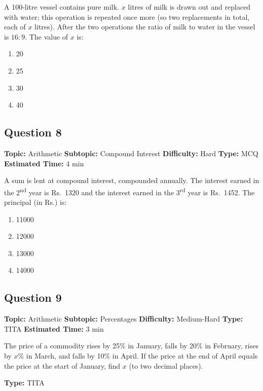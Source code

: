 \documentclass[11pt]{article}
\begin{document}
\begin{tcolorbox}
A 100-litre vessel contains pure milk. $x$ litres of milk is drawn out and replaced with water; this operation is repeated once more (so two replacements in total, each of $x$ litres). After the two operations the ratio of milk to water in the vessel is $16:9$. The value of $x$ is:
\end{tcolorbox}
\begin{enumerate}[label=(\Alph*)]
\item 20
\item 25
\item 30
\item 40
\end{enumerate}

\subsection*{Question 8}
\textbf{Topic:} Arithmetic \quad \textbf{Subtopic:} Compound Interest \quad \textbf{Difficulty:} Hard \quad \textbf{Type:} MCQ \quad \textbf{Estimated Time:} 4 min

\begin{tcolorbox}
A sum is lent at compound interest, compounded annually. The interest earned in the 2\textsuperscript{nd} year is Rs.\ 1320 and the interest earned in the 3\textsuperscript{rd} year is Rs.\ 1452. The principal (in Rs.) is:
\end{tcolorbox}
\begin{enumerate}[label=(\Alph*)]
\item 11000
\item 12000
\item 13000
\item 14000
\end{enumerate}

\subsection*{Question 9}
\textbf{Topic:} Arithmetic \quad \textbf{Subtopic:} Percentages \quad \textbf{Difficulty:} Medium-Hard \quad \textbf{Type:} TITA \quad \textbf{Estimated Time:} 3 min

\begin{tcolorbox}
The price of a commodity rises by 25\% in January, falls by 20\% in February, rises by $x\%$ in March, and falls by 10\% in April. If the price at the end of April equals the price at the start of January, find $x$ (to two decimal places).
\end{tcolorbox}
\textbf{Type:} TITA
\end{document}
